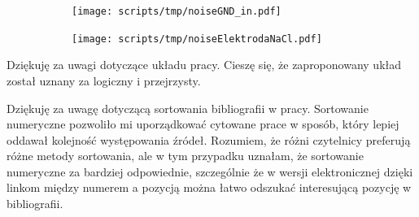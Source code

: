 \begin{frame}[t]
    \begin{block}{\dk}
    \end{block}
    \begin{figure}[H]
        \centering
        \begin{subfigure}[b]{0.485\textwidth}
            \centering
            \texttt{[image: scripts/tmp/noiseGND\_in.pdf]}
        \end{subfigure}
        \begin{subfigure}[b]{0.485\textwidth}
            \centering
            \texttt{[image: scripts/tmp/noiseElektrodaNaCl.pdf]}
        \end{subfigure}     
    \end{figure}
\end{frame}


\begin{frame}[t]
    \begin{block}{\tb}
    \end{block}

    \begin{block}{\tb}
    \end{block}

    Dziękuję za uwagi dotyczące układu  pracy. Cieszę się, że zaproponowany  układ został uznany za logiczny i przejrzysty. 
    \begin{block}{\tb}
    \end{block}
    {\renewcommand\normalsize{\scriptsize}%
    \normalsize
        Dziękuję za uwagę dotyczącą sortowania bibliografii w pracy. 
        Sortowanie numeryczne pozwoliło mi uporządkować cytowane prace w sposób, który lepiej oddawał kolejność występowania źródeł. 
        Rozumiem, że różni czytelnicy preferują różne metody sortowania, ale w tym przypadku uznałam, że sortowanie numeryczne za bardziej odpowiednie, szczególnie że w wersji elektronicznej dzięki linkom między numerem a pozycją można łatwo odszukać interesującą pozycję w bibliografii.
    }
\end{frame}

